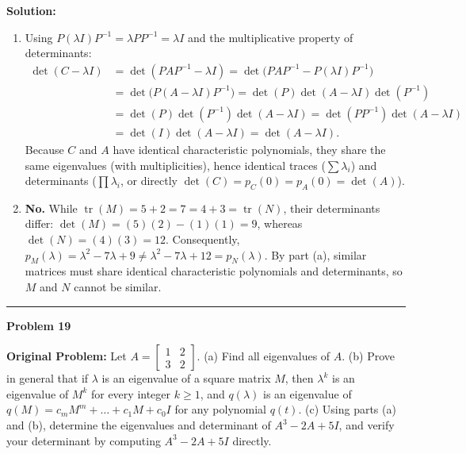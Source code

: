 \documentclass[11pt, letterpaper]{article}
\theoremstyle{definition}
\theoremstyle{remark}
\begin{document}
\textbf{Solution:}
\begin{enumerate}[label=(\alph*), topsep=3pt, itemsep=4pt]
    \item Using $P(\lambda I)P^{-1} = \lambda PP^{-1} = \lambda I$ and the multiplicative property of determinants:
    \begin{align*}
    \det(C - \lambda I) &= \det(PAP^{-1} - \lambda I) = \det\big(PAP^{-1} - P(\lambda I)P^{-1}\big) \\
    &= \det\big(P(A - \lambda I)P^{-1}\big) = \det(P)\det(A - \lambda I)\det(P^{-1}) \\
    &= \det(P)\det(P^{-1})\det(A - \lambda I) = \det(PP^{-1})\det(A - \lambda I) \\
    &= \det(I)\det(A - \lambda I) = \det(A - \lambda I).
    \end{align*}
    Because $C$ and $A$ have identical characteristic polynomials, they share the same eigenvalues (with multiplicities), hence identical traces ($\sum \lambda_i$) and determinants ($\prod \lambda_i$, or directly $\det(C) = p_C(0) = p_A(0) = \det(A)$).
    \item \textbf{No.} While $\operatorname{tr}(M) = 5 + 2 = 7 = 4 + 3 = \operatorname{tr}(N)$, their determinants differ: $\det(M) = (5)(2) - (1)(1) = 9$, whereas $\det(N) = (4)(3) = 12$. Consequently, $p_M(\lambda) = \lambda^2 - 7\lambda + 9 \neq \lambda^2 - 7\lambda + 12 = p_N(\lambda)$. By part (a), similar matrices must share identical characteristic polynomials and determinants, so $M$ and $N$ cannot be similar.
\end{enumerate}

\noindent\rule{\textwidth}{0.4pt}

\noindent\textbf{Problem 19}

\textbf{Original Problem:} Let $A = \begin{bmatrix} 1 & 2 \\ 3 & 2 \end{bmatrix}$. (a) Find all eigenvalues of $A$. (b) Prove in general that if $\lambda$ is an eigenvalue of a square matrix $M$, then $\lambda^k$ is an eigenvalue of $M^k$ for every integer $k \ge 1$, and $q(\lambda)$ is an eigenvalue of $q(M) = c_m M^m + \dots + c_1 M + c_0 I$ for any polynomial $q(t)$. (c) Using parts (a) and (b), determine the eigenvalues and determinant of $A^3 - 2A + 5I$, and verify your determinant by computing $A^3 - 2A + 5I$ directly.
\end{document}
